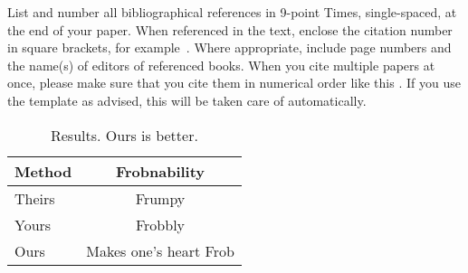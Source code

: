 \documentclass[10pt,twocolumn,letterpaper]{article}
\begin{document}
List and number all bibliographical references in 9-point Times, single-spaced, at the end of your paper.
When referenced in the text, enclose the citation number in square brackets, for
example~\cite{Authors14}.
Where appropriate, include page numbers and the name(s) of editors of referenced books.
When you cite multiple papers at once, please make sure that you cite them in numerical order like this \cite{Alpher02,Alpher03,Alpher05,Authors14b,Authors14}.
If you use the template as advised, this will be taken care of automatically.

\begin{table}
  \centering
  \begin{tabular}{@{}lc@{}}
    \toprule
    Method & Frobnability \\
    \midrule
    Theirs & Frumpy \\
    Yours & Frobbly \\
    Ours & Makes one's heart Frob\\
    \bottomrule
  \end{tabular}
  \caption{Results.   Ours is better.}
  \label{tab:example}
\end{table}



{\small


}
\end{document}
